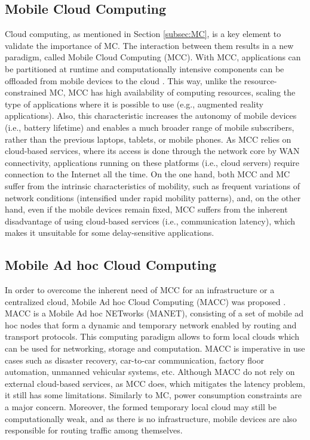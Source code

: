 \subsection{Mobile Cloud Computing}
Cloud computing, as mentioned in Section \ref{subsec:MC}, is a key element to validate the importance of MC. The interaction between them results in a new paradigm, called Mobile Cloud Computing (MCC). With MCC, applications can be partitioned at runtime and computationally intensive components can be offloaded from mobile devices to the cloud \cite{shiraz2013review}. This way, unlike the resource-constrained MC, MCC has high availability of computing resources, scaling the type of applications where it is possible to use (e.g., augmented reality applications). Also, this characteristic increases the autonomy of mobile devices (i.e., battery lifetime) and  enables a much broader range of mobile subscribers, rather than the previous laptops, tablets, or mobile phones. As MCC relies on cloud-based services, where its access is done through the network core by WAN connectivity, applications running on these platforms (i.e., cloud servers) require connection to the Internet all the time.
On the one hand, both MCC and MC suffer from the intrinsic characteristics of mobility, such as frequent variations of network conditions (intensified under rapid mobility patterns), and, on the other hand, even if the mobile devices remain fixed, MCC suffers from the inherent disadvantage of using cloud-based services (i.e., communication latency), which makes it unsuitable for some delay-sensitive applications.

\subsection{Mobile Ad hoc Cloud Computing}
In order to overcome the inherent need of MCC for an infrastructure or a centralized cloud, Mobile Ad hoc Cloud Computing (MACC) was proposed \cite{hubaux2001toward}. MACC is a Mobile Ad hoc NETworks (MANET), consisting of a set of mobile ad hoc nodes that form a dynamic and temporary network enabled by routing and transport protocols. This computing paradigm allows to form local clouds which can be used for networking, storage and computation. MACC is imperative in use cases such as disaster recovery, car-to-car communication, factory floor automation, unmanned vehicular systems, etc. Although MACC do not rely on external cloud-based services, as MCC does, which mitigates the latency problem, it still has some limitations. Similarly to MC, power consumption constraints are a major concern. Moreover, the formed temporary local cloud may still be computationally weak, and as there is no infrastructure, mobile devices are also responsible for routing traffic among themselves. 

